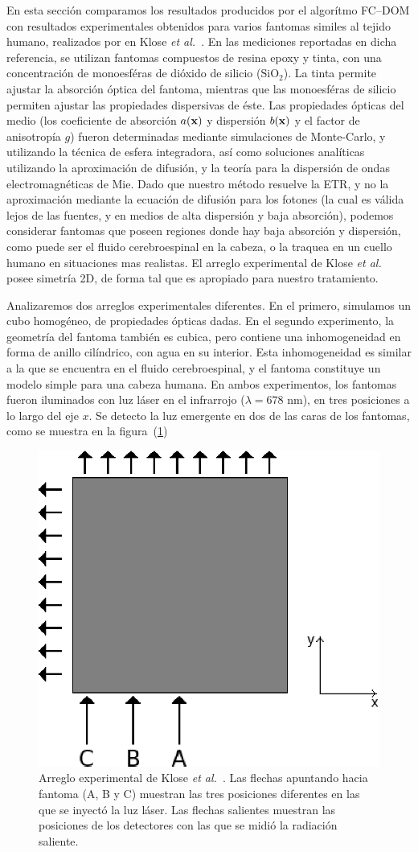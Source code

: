 En esta sección comparamos los resultados producidos por el algorítmo FC--DOM 
con resultados experimentales obtenidos para varios 
fantomas similes al tejido humano, realizados por en Klose \textit{et al.}~\cite{Klose2002}. 
En las mediciones reportadas en dicha referencia, 
se utilizan fantomas compuestos de resina epoxy y tinta, 
con una concentración de monoesféras de dióxido de silicio ($\text{SiO}_2$). 
La tinta permite ajustar la absorción óptica del fantoma, 
mientras que las monoesféras de silicio permiten ajustar las propiedades 
dispersivas de éste. Las propiedades ópticas del medio (los coeficiente de absorción $a(\mathbf{x})$
y dispersión $b(\mathbf{x})$ y el 
factor de anisotropía $g$) fueron determinadas mediante simulaciones de Monte-Carlo, 
y utilizando la técnica de esfera integradora, así como soluciones analíticas 
utilizando la aproximación de difusión, y la teoría para 
la dispersión de ondas electromagnéticas de Mie. 
Dado que nuestro método resuelve la ETR, y no la aproximación mediante 
la ecuación de difusión para los fotones 
(la cual es válida lejos de las fuentes, y en medios de alta dispersión y 
baja absorción), podemos considerar fantomas que poseen 
regiones donde hay baja absorción y dispersión, como puede ser el fluido cerebroespinal 
en la cabeza, o la traquea en un cuello humano en situaciones mas realistas. 
El arreglo experimental de Klose \textit{et al.} posee 
simetría 2D, de forma tal que es apropiado para nuestro tratamiento. 

Analizaremos dos arreglos experimentales diferentes.
 En el primero, simulamos un cubo homogéneo, de propiedades ópticas dadas.
 En el segundo experimento, la geometría del fantoma también 
 es cubica, pero contiene una inhomogeneidad en forma 
 de anillo cilíndrico, con agua en su interior. Esta inhomogeneidad 
 es similar a la que se encuentra en 
 el fluido cerebroespinal, y el fantoma constituye un modelo 
 simple para una cabeza humana. En ambos experimentos,
los fantomas fueron iluminados con luz láser en el 
infrarrojo ($\lambda = 678$ nm), en tres posiciones a lo largo del eje $x$. Se detecto la luz emergente 
en dos de las caras de los fantomas, como se muestra en la figura~(\ref{fig:phantom})

\begin{figure}[h!]
\centering
  \includegraphics[width=0.4\linewidth]{figuras/phantom.eps}
   \caption{Arreglo experimental de Klose \textit{et al.}~\cite{Klose2002}. 
   Las flechas apuntando hacia fantoma (A, B y C)  
   muestran las tres posiciones diferentes en las que se inyectó 
   la luz láser. Las flechas salientes muestran las posiciones de los detectores 
   con las que se midió la radiación saliente.}
 \label{fig:phantom}
\end{figure}


